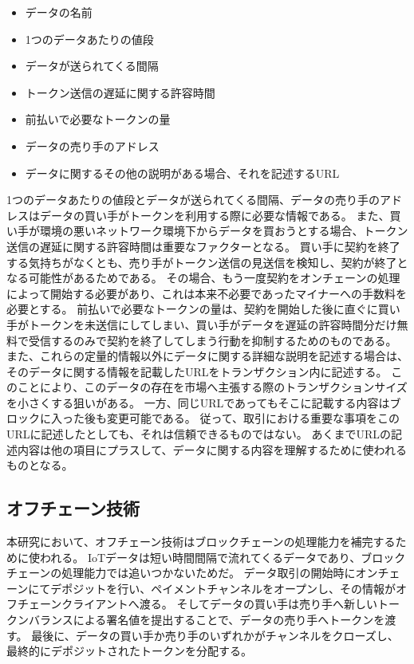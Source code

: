 \begin{itemize}
\item データの名前
\item 1つのデータあたりの値段
\item データが送られてくる間隔
\item トークン送信の遅延に関する許容時間
\item 前払いで必要なトークンの量
\item データの売り手のアドレス
\item データに関するその他の説明がある場合、それを記述するURL
\end{itemize}

1つのデータあたりの値段とデータが送られてくる間隔、データの売り手のアドレスはデータの買い手がトークンを利用する際に必要な情報である。
また、買い手が環境の悪いネットワーク環境下からデータを買おうとする場合、トークン送信の遅延に関する許容時間は重要なファクターとなる。
買い手に契約を終了する気持ちがなくとも、売り手がトークン送信の見送信を検知し、契約が終了となる可能性があるためである。
その場合、もう一度契約をオンチェーンの処理によって開始する必要があり、これは本来不必要であったマイナーへの手数料を必要とする。
前払いで必要なトークンの量は、契約を開始した後に直ぐに買い手がトークンを未送信にしてしまい、買い手がデータを遅延の許容時間分だけ無料で受信するのみで契約を終了してしまう行動を抑制するためのものである。
また、これらの定量的情報以外にデータに関する詳細な説明を記述する場合は、そのデータに関する情報を記載したURLをトランザクション内に記述する。
このことにより、このデータの存在を市場へ主張する際のトランザクションサイズを小さくする狙いがある。
一方、同じURLであってもそこに記載する内容はブロックに入った後も変更可能である。
従って、取引における重要な事項をこのURLに記述したとしても、それは信頼できるものではない。
あくまでURLの記述内容は他の項目にプラスして、データに関する内容を理解するために使われるものとなる。

\subsection{オフチェーン技術}
本研究において、オフチェーン技術はブロックチェーンの処理能力を補完するために使われる。
IoTデータは短い時間間隔で流れてくるデータであり、ブロックチェーンの処理能力では追いつかないためだ。
データ取引の開始時にオンチェーンにてデポジットを行い、ペイメントチャンネルをオープンし、その情報がオフチェーンクライアントへ渡る。
そしてデータの買い手は売り手へ新しいトークンバランスによる署名値を提出することで、データの売り手へトークンを渡す。
最後に、データの買い手か売り手のいずれかがチャンネルをクローズし、最終的にデポジットされたトークンを分配する。

